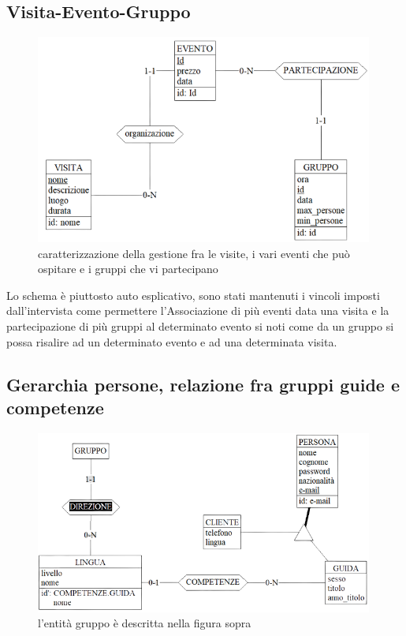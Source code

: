 \documentclass[a4paper,12pt]{report}
\begin{document}
\subsection*{Visita-Evento-Gruppo}
\begin{figure}[H]
	\centering
	\includegraphics[width=0.99\textwidth]{evento-visita-gruppo.png}
	\caption[]{caratterizzazione della gestione fra le visite, i vari eventi che può ospitare e i gruppi che vi partecipano}
\end{figure}
Lo schema è piuttosto auto esplicativo, sono stati mantenuti i vincoli imposti
dall'intervista come permettere l'Associazione di più eventi data una visita e 
la partecipazione di più gruppi al determinato evento si noti come da un gruppo 
si possa risalire ad un determinato evento e ad una determinata visita.
\subsection*{Gerarchia persone, relazione fra gruppi guide e competenze}
\begin{figure}[H]
	\centering
	\includegraphics[width=0.99\textwidth]{gruppo-guide.png}
	\caption[]{l'entità gruppo è descritta nella figura sopra}
\end{figure}
\end{document}
